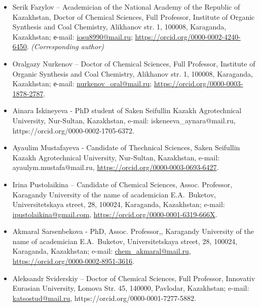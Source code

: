 \begin{itemize}
\item
Serik Fazylov -- Academician of the National Academy of the Republic of
Kazakhstan, Doctor of Chemical Sciences, Full Professor, Institute of
Organic Synthesis and Coal Chemistry, Alikhanov str. 1, 100008,
Karaganda, Kazakhstan; е-mail:
\url{iosu8990@mail.ru};
\url{https://orcid.org/0000-0002-4240-6450}. \emph{(Corresponding
author)}

\item
Oralgazy Nurkenov -- Doctor of Chemical Sciences, Full Professor,
Institute of Organic Synthesis and Coal Chemistry, Alikhanov str. 1,
100008, Karaganda, Kazakhstan; е-mail:
\href{mailto:nurkenov_oral@mail.ru}{nurkenov\_oral@mail.ru};
\url{https://orcid.org/0000-0003-1878-2787}.

\item
Ainara Iskineyeva - PhD student of Saken Seifullin Kazakh Agrotechnical
University, Nur-Sultan, Kazakhstan, e-mail: iskeneeva\_aynara@mail.ru,
https://orcid.org/0000-0002-1705-6372.

\item
Ayaulim Mustafayeva - Candidate of Thechnical Sciences, Saken Seifullin
Kazakh Agrotechnical University, Nur-Sultan, Kazakhstan, e-mail:
ayaulym.mustafa@mail.ru,
\href{https://orcid.org/0000-0003-0693-6427}{https://orcid.org/0000-0003-0693-6427}.

\item
Irina Pustolaikina -- Candidate of Chemical Sciences, Assoc. Professor,
Karagandy University of the name of academician E.A.~Buketov,
Universitetskaya street, 28, 100024, Karaganda, Kazakhstan; e-mail:
\href{mailto:ipustolaikina@gmail.com}{ipustolaikina@gmail.com},
\url{https://orcid.org/0000-0001-6319-666X}.

\item
Akmaral Sarsenbekova - PhD, Assoc. Professor,, Karagandy University of
the name of academician E.A.~Buketov, Universitetskaya street, 28,
100024, Karaganda, Kazakhstan; e-mail:
\href{mailto:chem_akmaral@mail.ru}{chem\_akmaral@mail.ru},
\url{https://orcid.org/0000-0002-8951-3616}.

\item
Aleksandr Sviderskiy -- Doctor of Chemical Sciences, Full Professor,
Innovativ Eurasian University, Lomova Str. 45, 140000, Pavlodar,
Kazakhstan; e-mail:
\href{mailto:katsostud@mail.ru}{katsostud@mail.ru},
https://orcid.org/0000-0001-7277-5882.
\end{itemize}
